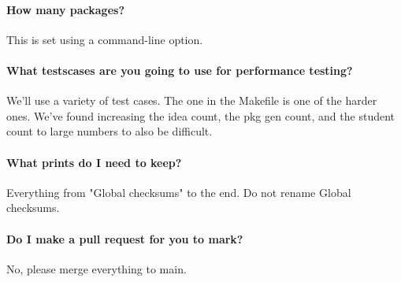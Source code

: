 \paragraph{How many packages?} This is set using a command-line option.

\paragraph{What testscases are you going to use for performance testing?} We'll use a variety of test cases. The one in the Makefile is one of the harder ones. We've found increasing the idea count, the pkg gen count, and the student count to large numbers to also be difficult.

\paragraph{What prints do I need to keep?} Everything from "Global checksums" to the end. Do not rename Global checksums.

\paragraph{Do I make a pull request for you to mark?} No, please merge everything to main.




